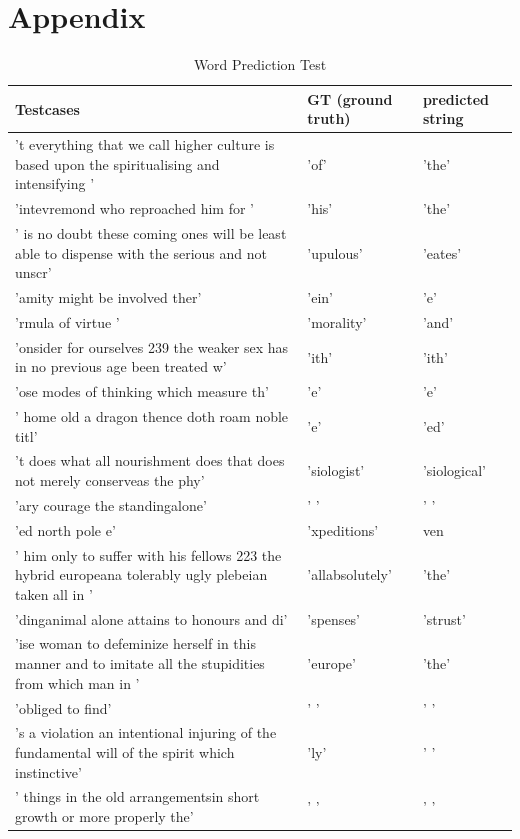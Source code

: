 \documentclass[11pt,a4paper,bibliography=totocnumbered,listof=totocnumbered]{scrartcl}
\begin{document}
\section{Appendix}
\begin{table}[H]
\tiny
\centering
\caption{Word Prediction Test}
\begin{tabularx}{\textwidth}{X|X|X}

Testcases & GT (ground truth) & predicted string\\
\toprule
't everything that we call higher culture is based upon the spiritualising and intensifying ' & 'of' & 'the' \\ 
\hline 
'intevremond who reproached him for ' & 'his' & 'the' \\ 
\hline 
' is no doubt these coming ones will be least able to dispense with the serious and not unscr' & 'upulous' & 'eates' \\ 
\hline 
'amity might be involved ther' & 'ein' & 'e' \\ 
\hline 
'rmula of virtue ' & 'morality' & 'and' \\ 
\hline 
'onsider for ourselves  239 the weaker sex has in no previous age been treated w' & 'ith' & 'ith' \\ 
\hline 
'ose modes of thinking which measure th' & 'e' & 'e' \\ 
\hline 
' home old a dragon thence doth roam  noble titl' & 'e' & 'ed' \\ 
\hline 
't does what all nourishment does that does not merely conserveas the phy' & 'siologist' & 'siological' \\ 
\hline 
'ary courage the standingalone' & ' ' & ' ' \\ 
\hline 
'ed north pole e' & 'xpeditions' & ven \\ 
\hline 
' him only to suffer with his fellows  223 the hybrid europeana tolerably ugly plebeian taken all in ' & 'allabsolutely' & 'the' \\ 
\hline 
'dinganimal alone attains to honours and di' & 'spenses' & 'strust' \\ 
\hline 
'ise woman to defeminize herself in this manner and to imitate all the stupidities from which man in ' & 'europe' & 'the' \\ 
\hline 
'obliged to find' & ' ' & ' ' \\ 
\hline 
's a violation an intentional injuring of the fundamental will of the spirit which instinctive' & 'ly' & ' ' \\ 
\hline 
' things in the old arrangementsin short growth or more properly the' & ' ' & ' ' \\ 

\end{tabularx}
\end{table}
\end{document}
